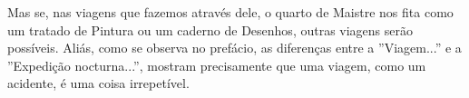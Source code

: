 \documentclass[12pt]{article}
\begin{document}
Mas se, nas viagens que fazemos através dele, o quarto de Maistre nos
fita como um tratado de Pintura ou um caderno de Desenhos, outras
viagens serão possíveis. Aliás, como se observa no prefácio, as
diferenças entre a ''Viagem...'' e a ''Expedição nocturna...'',
mostram precisamente que uma viagem, como um acidente, é uma coisa
irrepetível.

\renewcommand*{\bibfont}{\footnotesize}

\printbibliography[heading=bibliography,title={\hspace{1cm}Referências}]
\end{document}
